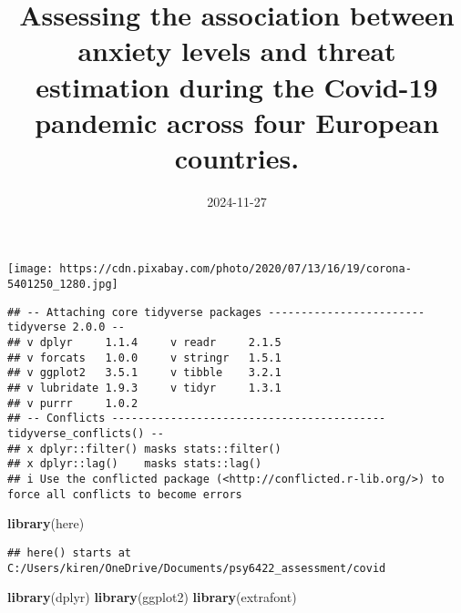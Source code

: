 \documentclass[
]{article}
\title{Assessing the association between anxiety levels and threat
estimation during the Covid-19 pandemic across four European countries.}
\author{}
\date{\vspace{-2.5em}2024-11-27}
\newenvironment{Shaded}{\begin{snugshade}}{\end{snugshade}}
\newcommand{\AttributeTok}[1]{\textcolor[rgb]{0.13,0.29,0.53}{#1}}
\newcommand{\ConstantTok}[1]{\textcolor[rgb]{0.56,0.35,0.01}{#1}}
\newcommand{\DecValTok}[1]{\textcolor[rgb]{0.00,0.00,0.81}{#1}}
\newcommand{\FunctionTok}[1]{\textcolor[rgb]{0.13,0.29,0.53}{\textbf{#1}}}
\newcommand{\NormalTok}[1]{#1}
\newcommand{\SpecialCharTok}[1]{\textcolor[rgb]{0.81,0.36,0.00}{\textbf{#1}}}
\begin{document}
\maketitle

{
\setcounter{tocdepth}{2}
\tableofcontents
}
\texttt{[image: https://cdn.pixabay.com/photo/2020/07/13/16/19/corona-5401250\_1280.jpg]}

\begin{Shaded}
\end{Shaded}

\begin{verbatim}
## -- Attaching core tidyverse packages ------------------------ tidyverse 2.0.0 --
## v dplyr     1.1.4     v readr     2.1.5
## v forcats   1.0.0     v stringr   1.5.1
## v ggplot2   3.5.1     v tibble    3.2.1
## v lubridate 1.9.3     v tidyr     1.3.1
## v purrr     1.0.2     
## -- Conflicts ------------------------------------------ tidyverse_conflicts() --
## x dplyr::filter() masks stats::filter()
## x dplyr::lag()    masks stats::lag()
## i Use the conflicted package (<http://conflicted.r-lib.org/>) to force all conflicts to become errors
\end{verbatim}

\begin{Shaded}
\begin{Highlighting}[]
\FunctionTok{library}\NormalTok{(here)}
\end{Highlighting}
\end{Shaded}

\begin{verbatim}
## here() starts at C:/Users/kiren/OneDrive/Documents/psy6422_assessment/covid
\end{verbatim}

\begin{Shaded}
\begin{Highlighting}[]
\FunctionTok{library}\NormalTok{(dplyr)}
\FunctionTok{library}\NormalTok{(ggplot2)}
\FunctionTok{library}\NormalTok{(extrafont)}
\end{Highlighting}
\end{Shaded}
\end{document}
